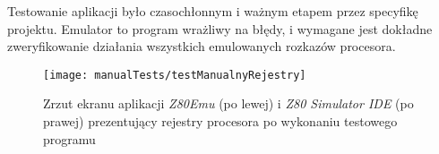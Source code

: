     \newpage
    Testowanie aplikacji było czasochłonnym i ważnym etapem przez specyfikę projektu. Emulator to program wrażliwy na błędy, i wymagane jest dokładne zweryfikowanie działania wszystkich emulowanych rozkazów procesora.
    
    \begin{figure}[h]
    		\centering
    		\texttt{[image: manualTests/testManualnyRejestry]}
    		\caption{Zrzut ekranu aplikacji \emph{Z80Emu} (po lewej) i \emph{Z80 Simulator IDE} (po prawej) prezentujący rejestry procesora po wykonaniu testowego programu}
    		\label{img:testManualnyRejestry}
    \end{figure}

    
    
    
    
    